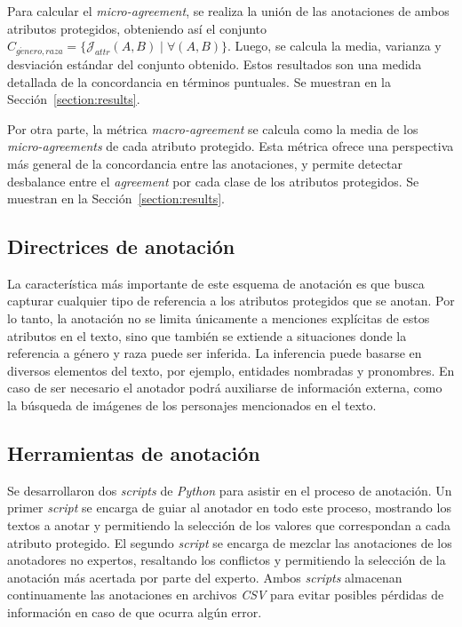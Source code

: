 Para calcular el \emph{micro-agreement}, se realiza la uni\'on de las anotaciones de ambos atributos protegidos, obteniendo as\'i
el conjunto $C_{g\acute{e}nero, raza} = \{\mathcal{J}_{attr}(A, B) \mid \forall (A, B)\}$. Luego, se calcula la media, varianza y
desviaci\'on est\'andar del conjunto obtenido. Estos resultados son una medida detallada de la concordancia en t\'erminos puntuales.
Se muestran en la Secci\'on~\ref{section:results}.

Por otra parte, la m\'etrica \emph{macro-agreement} se calcula como la media de los \emph{micro-agreements} de cada atributo protegido. 
Esta m\'etrica ofrece una perspectiva m\'as general de la concordancia entre las anotaciones, y permite detectar desbalance entre 
el \emph{agreement} por cada clase de los atributos protegidos. Se muestran en la Secci\'on~\ref{section:results}.

\subsection{Directrices de anotaci\'on}\label{section:annotation_guidelines}
La caracter\'istica m\'as importante de este esquema de anotaci\'on es que busca capturar cualquier tipo de referencia a los atributos 
protegidos que se anotan. Por lo tanto, la anotaci\'on no se limita \'unicamente a menciones expl\'icitas de estos atributos en el 
texto, sino que tambi\'en se extiende a situaciones donde la referencia a g\'enero y raza puede ser inferida. La inferencia puede 
basarse en diversos elementos del texto, por ejemplo, entidades nombradas y pronombres. En caso de ser necesario el anotador podr\'a
auxiliarse de informaci\'on externa, como la b\'usqueda de im\'agenes de los personajes mencionados en el texto.

\subsection{Herramientas de anotaci\'on}
Se desarrollaron dos \emph{scripts} de \emph{Python} para asistir en el proceso de anotaci\'on. Un primer \emph{script}
se encarga de guiar al anotador en todo este proceso, mostrando los textos a anotar y permitiendo la selecci\'on de los valores
que correspondan a cada atributo protegido. El segundo \emph{script} se encarga de mezclar las anotaciones de los anotadores 
no expertos, resaltando los conflictos y permitiendo la selecci\'on de la anotaci\'on m\'as acertada por parte del experto. 
Ambos \emph{scripts} almacenan continuamente las anotaciones en archivos \emph{CSV} para evitar posibles p\'erdidas de 
informaci\'on en caso de que ocurra alg\'un error.

